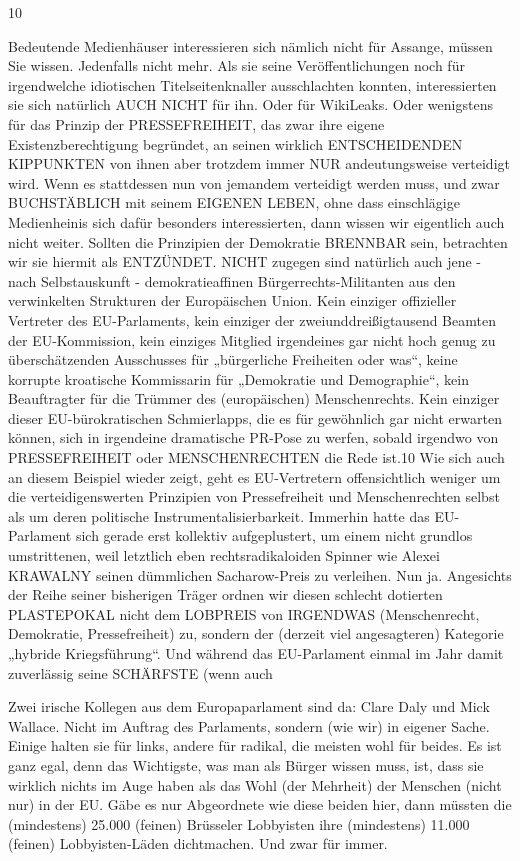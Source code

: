 \begin{multicols}{2}
10

Bedeutende Medienhäuser interessieren sich nämlich
nicht für Assange, müssen Sie wissen. Jedenfalls nicht
mehr. Als sie seine Veröffentlichungen noch für irgendwelche idiotischen Titelseitenknaller ausschlachten
konnten, interessierten sie sich natürlich AUCH NICHT
für ihn. Oder für WikiLeaks. Oder wenigstens für das
Prinzip der PRESSEFREIHEIT, das zwar ihre eigene Existenzberechtigung begründet, an seinen wirklich ENTSCHEIDENDEN KIPPUNKTEN von ihnen aber trotzdem
immer NUR andeutungsweise verteidigt wird.
Wenn es stattdessen nun von jemandem verteidigt werden muss, und zwar BUCHSTÄBLICH mit seinem EIGENEN LEBEN, ohne dass einschlägige Medienheinis sich
dafür besonders interessierten, dann wissen wir eigentlich auch nicht weiter. Sollten die Prinzipien der Demokratie BRENNBAR sein, betrachten wir sie hiermit als
ENTZÜNDET.
NICHT zugegen sind natürlich auch jene - nach Selbstauskunft - demokratieaffinen Bürgerrechts-Militanten
aus den verwinkelten Strukturen der Europäischen Union. Kein einziger offizieller Vertreter des EU-Parlaments,
kein einziger der zweiunddreißigtausend Beamten der
EU-Kommission, kein einziges Mitglied irgendeines
gar nicht hoch genug zu überschätzenden Ausschusses
für „bürgerliche Freiheiten oder was“, keine korrupte
kroatische Kommissarin für „Demokratie und Demographie“, kein Beauftragter für die Trümmer des (europäischen) Menschenrechts. Kein einziger dieser EU-bürokratischen Schmierlapps, die es für gewöhnlich gar
nicht erwarten können, sich in irgendeine dramatische
PR-Pose zu werfen, sobald irgendwo von PRESSEFREIHEIT oder MENSCHENRECHTEN die Rede ist.10
Wie sich auch an diesem Beispiel wieder zeigt, geht es
EU-Vertretern offensichtlich weniger um die verteidigenswerten Prinzipien von Pressefreiheit und Menschenrechten selbst als um deren politische Instrumentalisierbarkeit.
Immerhin hatte das EU-Parlament sich gerade erst kollektiv aufgeplustert, um einem nicht grundlos umstrittenen, weil letztlich eben rechtsradikaloiden Spinner wie
Alexei KRAWALNY seinen dümmlichen Sacharow-Preis
zu verleihen. Nun ja. Angesichts der Reihe seiner bisherigen Träger ordnen wir diesen schlecht dotierten PLASTEPOKAL nicht dem LOBPREIS von IRGENDWAS (Menschenrecht, Demokratie, Pressefreiheit) zu, sondern der
(derzeit viel angesagteren) Kategorie „hybride Kriegsführung“. Und während das EU-Parlament einmal im
Jahr damit zuverlässig seine SCHÄRFSTE (wenn auch

Zwei irische Kollegen aus dem Europaparlament sind da: Clare Daly und Mick Wallace. Nicht im Auftrag des
Parlaments, sondern (wie wir) in eigener Sache. Einige halten sie für links, andere für radikal, die meisten wohl
für beides. Es ist ganz egal, denn das Wichtigste, was man als Bürger wissen muss, ist, dass sie wirklich nichts
im Auge haben als das Wohl (der Mehrheit) der Menschen (nicht nur) in der EU. Gäbe es nur Abgeordnete wie
diese beiden hier, dann müssten die (mindestens) 25.000 (feinen) Brüsseler Lobbyisten ihre (mindestens)
11.000 (feinen) Lobbyisten-Läden dichtmachen. Und zwar für immer.


\end{multicols}
